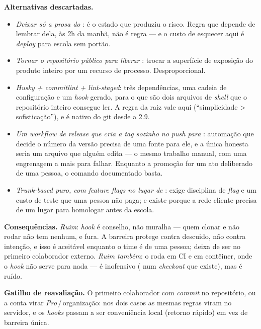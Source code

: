 \textbf{Alternativas descartadas.}
\begin{itemize}
  \item \emph{Deixar só a prosa do }: é o estado que produziu o
    risco. Regra que depende de lembrar dela, às 2h da manhã, não é regra --- e
    o custo de esquecer aqui é \emph{deploy} para escola sem portão.
  \item \emph{Tornar o repositório público para liberar }: trocar
    a superfície de exposição do produto inteiro por um recurso de processo.
    Desproporcional.
  \item \emph{\emph{Husky} + \emph{commitlint} + \emph{lint-staged}}: três
    dependências, uma cadeia de configuração e um \emph{hook} gerado, para o que
    são dois arquivos de \emph{shell} que o repositório inteiro consegue ler. A
    regra da raiz vale aqui (\enquote{simplicidade > sofisticação}), e
     é nativo do git desde a 2.9.
  \item \emph{Um \emph{workflow} de \emph{release} que cria a \emph{tag}
    sozinho no \emph{push} para }: automação que decide o número da
    versão precisa de uma fonte para ele, e a única honesta seria um arquivo que
    alguém edita --- o mesmo trabalho manual, com uma engrenagem a mais para
    falhar. Enquanto a promoção for um ato deliberado de uma pessoa, o comando
    documentado basta.
  \item \emph{\emph{Trunk-based} puro, com \emph{feature flags} no lugar de
    }: exige disciplina de \emph{flag} e um custo de teste que uma
    pessoa não paga; e  existe porque a rede cliente precisa de um lugar
    para homologar antes da escola.
\end{itemize}

\textbf{Consequências.} \emph{Ruim}: \emph{hook} é conselho, não muralha --- quem
clonar e não rodar  não tem nenhum, e  fura.
A barreira protege contra descuido, não contra intenção, e isso é aceitável
enquanto o time é de uma pessoa; deixa de ser no primeiro colaborador externo.
\emph{Ruim também}: o  roda em CI e em contêiner, onde o
\emph{hook} não serve para nada --- é inofensivo ( num
\emph{checkout} que existe), mas é ruído.

\textbf{Gatilho de reavaliação.} O primeiro colaborador com \emph{commit} no
repositório, ou a conta virar \emph{Pro}\,/\,organização: nos dois casos as
mesmas regras viram  no servidor, e os \emph{hooks} passam a ser
conveniência local (retorno rápido) em vez de barreira única.

